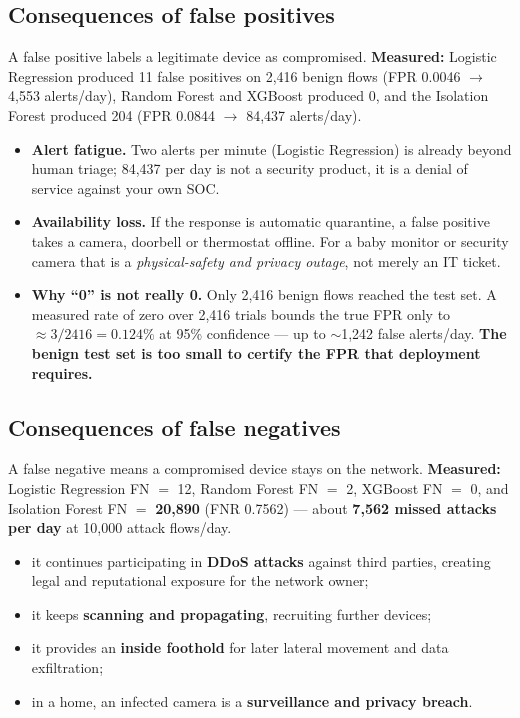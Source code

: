 \documentclass[11pt]{article}
\begin{document}
\subsection{Consequences of false positives}
A false positive labels a legitimate device as compromised. \textbf{Measured:}
Logistic Regression produced 11 false positives on 2,416 benign flows (FPR
0.0046 $\rightarrow$ 4,553 alerts/day), Random Forest and XGBoost produced 0,
and the Isolation Forest produced 204 (FPR 0.0844 $\rightarrow$ 84,437
alerts/day).
\begin{itemize}[itemsep=2pt]
  \item \textbf{Alert fatigue.} Two alerts per minute (Logistic Regression) is
        already beyond human triage; 84,437 per day is not a security product,
        it is a denial of service against your own SOC.
  \item \textbf{Availability loss.} If the response is automatic quarantine, a
        false positive takes a camera, doorbell or thermostat offline. For a
        baby monitor or security camera that is a \emph{physical-safety and
        privacy outage}, not merely an IT ticket.
  \item \textbf{Why ``0'' is not really 0.} Only 2,416 benign flows reached the
        test set. A measured rate of zero over 2,416 trials bounds the true FPR
        only to $\approx 3/2416 = 0.124\%$ at 95\% confidence --- up to
        $\sim$1,242 false alerts/day. \textbf{The benign test set is too small
        to certify the FPR that deployment requires.}
\end{itemize}

\subsection{Consequences of false negatives}
A false negative means a compromised device stays on the network.
\textbf{Measured:} Logistic Regression FN $=$ 12, Random Forest FN $=$ 2,
XGBoost FN $=$ 0, and Isolation Forest FN $=$ \textbf{20,890} (FNR 0.7562) ---
about \textbf{7,562 missed attacks per day} at 10,000 attack flows/day.
\begin{itemize}[itemsep=2pt]
  \item it continues participating in \textbf{DDoS attacks} against third
        parties, creating legal and reputational exposure for the network owner;
  \item it keeps \textbf{scanning and propagating}, recruiting further devices;
  \item it provides an \textbf{inside foothold} for later lateral movement and
        data exfiltration;
  \item in a home, an infected camera is a \textbf{surveillance and privacy
        breach}.
\end{itemize}
\end{document}
